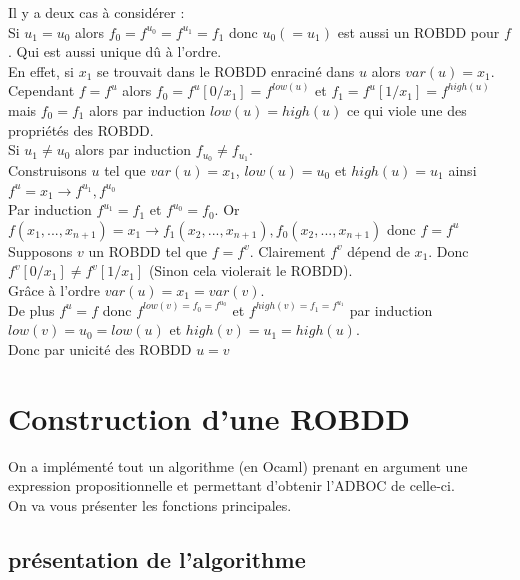 \documentclass[a4paper, oneside]{report}
\begin{document}
Il y a deux cas à considérer :\\

Si $u_1 = u_0$ alors $f_0 = f^{u_0} = f^{u_1} = f_1$ donc $u_0 (= u_1)$ est aussi un ROBDD pour $f$. Qui est aussi unique dû à l'ordre.\\
En effet, si $x_1$ se trouvait dans le ROBDD enraciné dans $u$ alors $var(u) = x_1$.\\
Cependant $f = f^u$ alors $f_0 = f^u[0/x_1] = f^{low(u)}$ et $f_1 = f^u[1/x_1] = f^{high(u)}$ mais $f_0 = f_1$ alors par induction $low(u) = high(u)$ ce qui viole une des propriétés des ROBDD.\\

Si $u_1 \neq u_0$ alors par induction $f_{u_0} \neq f_{u_1}$.\\
Construisons $u$ tel que $var(u) = x_1$, $low(u) = u_0$ et $high(u) = u_1$ ainsi $f^u = x_1 \rightarrow f^{u_1}, f^{u_0}$\\
Par induction $f^{u_1} = f_1$ et $f^{u_0} = f_0$. Or $f(x_1,...,x_{n+1}) = x_1 \rightarrow f_1(x_2,...,x_{n+1}), f_0(x_2,...,x_{n+1})$ donc $f = f^u$ \\
Supposons $v$ un ROBDD tel que $f = f^v$. Clairement $f^v$ dépend de $x_1$. Donc $f^v[0/x_1] \neq f^v[1/x_1]$ (Sinon cela violerait le ROBDD).\\
Grâce à l'ordre $var(u) = x_1 = var(v)$.\\
De plus $f^u = f$ donc $f^{low(v) = f_0 = f^{u_0}}$ et $f^{high(v) = f_1 = f^{u_1}}$ par induction $low(v) = u_0 = low(u)$ et $high(v) = u_1 = high(u)$.\\
Donc par unicité des ROBDD $u = v$


\chapter{Construction d'une ROBDD}

On a implémenté tout un algorithme (en Ocaml) prenant en argument une expression propositionnelle et permettant d'obtenir l'ADBOC de celle-ci.\\
On va vous présenter les fonctions principales.

\section{présentation de l'algorithme}
\end{document}
